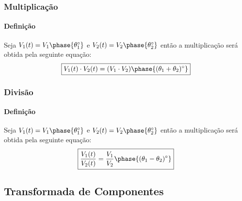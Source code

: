 \documentclass{article}
\begin{document}
            \begin{multicols}{2}
                \raggedcolumns
                \subsubsection{Multiplicação}
                    \paragraph{Definição}Seja $V_{1}(t) = V_{1} \phase{\theta_{1}^{\circ}}$ e $V_{2}(t) = V_{2} \phase{\theta_{2}^{\circ}}$ então a multiplicação será obtida pela seguinte equação:
                        \begin{equation}
                            \boxed{
                                V_{1}(t) \cdot V_{2}(t) = 
                                (V_{1} \cdot V_{2})\phase{(\theta_{1} + \theta_{2})^{\circ}}
                            }
                        \end{equation}

                \columnbreak

                \subsubsection{Divisão}
                    \paragraph{Definição}Seja $V_{1}(t) = V_{1} \phase{\theta_{1}^{\circ}}$ e $V_{2}(t) = V_{2} \phase{\theta_{2}^{\circ}}$ então a multiplicação será obtida pela seguinte equação:
                        \begin{equation}
                            \boxed{
                                \frac{V_{1}(t)}{V_{2}(t)} = 
                                \frac{V_{1}}{V_{2}} \phase{(\theta_{1} - \theta_{2})^{\circ}}
                            }
                        \end{equation}
            \end{multicols}

        \subsection{Transformada de Componentes}
\end{document}
